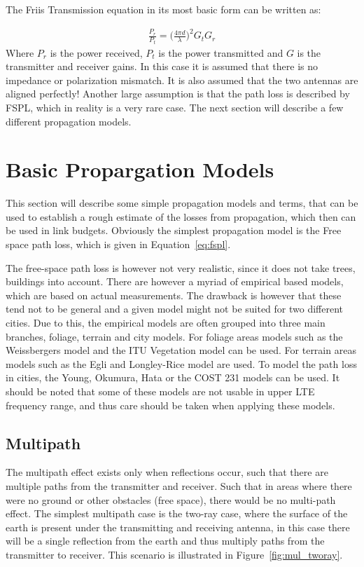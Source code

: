 The Friis Transmission equation in its most basic form can be written as: 

\begin{align}
  \frac{P_r}{P_t} = \big( \frac{4 \pi d}{\lambda} \big)^2 G_{t} G_{r}
\end{align}
Where $P_r$ is the power received, $P_t$ is the power transmitted and $G$ is the transmitter and receiver gains. In this case it is assumed that there is no impedance or polarization mismatch. It is also assumed that the two antennas are aligned perfectly! Another large assumption is that the path loss is described by FSPL, which in reality is a very rare case. The next section will describe a few different propagation models.


\section{Basic Propargation Models}
This section will describe some simple propagation models and terms, that can be used to establish a rough estimate of the losses from propagation, which then can be used in link budgets. Obviously the simplest propagation model is the Free space path loss, which is given in Equation~\ref{eq:fspl}.

The free-space path loss is however not very realistic, since it does not take trees, buildings into account\cite{balanis2012antenna}. There are however a myriad of empirical based models, which are based on actual measurements. The drawback is however that these tend not to be general and a given model might not be suited for two different cities. Due to this, the empirical models are often grouped into three main branches, foliage, terrain and city models\cite{goldsmith2005wireless}. For foliage areas models such as the Weissbergers model and the ITU Vegetation model can be used\cite{goldsmith2005wireless}. For terrain areas models such as the Egli and Longley-Rice model are used\cite{goldsmith2005wireless}. To model the path loss in cities, the Young, Okumura, Hata or the COST 231 models can be used\cite{goldsmith2005wireless}. It should be noted that some of these models are not usable in upper LTE frequency range, and thus care should be taken when applying these models. 


\subsection{Multipath}
The multipath effect exists only when reflections occur, such that there are multiple paths from the transmitter and receiver. Such that in areas where there were no ground or other obstacles (free space), there would be no multi-path effect. The simplest multipath case is the two-ray case, where the surface of the earth is present under the transmitting and receiving antenna, in this case there will be a single reflection from the earth and thus multiply paths from the transmitter to receiver. This scenario is illustrated in Figure~\ref{fig:mul_tworay}.
 
